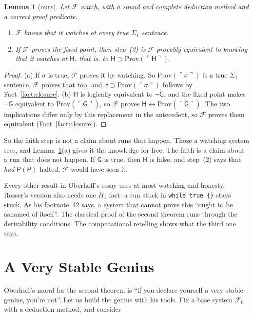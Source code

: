 \documentclass[11pt]{article}
\newcommand{\F}{\mathcal{F}}
\newcommand{\Fo}{\mathcal{F}_0}
\newcommand{\G}{\ddot{\mathsf{G}}}          %
\newcommand{\Hs}{\mathsf{H}}                %
\newcommand{\Prog}[1]{\mathsf{#1}}
\newcommand{\Prov}{\mathrm{Prov}}
\newcommand{\gn}[1]{\ulcorner #1\urcorner}  %
\theoremstyle{plain}
\newtheorem{lemma}[theorem]{Lemma}
\theoremstyle{definition}
\begin{document}
\begin{lemma}[ours]\label{lem:instances}
Let $\F$ watch, with a sound and complete deduction method and a correct
proof predicate.
\begin{enumerate}[label=(\alph*)]
\item $\F$ knows that it watches at every \emph{true} $\Sigma_1$ sentence.
\item If $\F$ proves the fixed point, then step~(2) is $\F$-provably
  equivalent to knowing that it watches at $\Hs$, that is, to
  $\Hs \supset \Prov(\gn{\Hs})$.
\end{enumerate}
\end{lemma}

\begin{proof}
(a) If $\sigma$ is true, $\F$ proves it by watching. So $\Prov(\gn{\sigma})$
is a true $\Sigma_1$ sentence, $\F$ proves that too, and
$\sigma \supset \Prov(\gn{\sigma})$ follows by Fact~\ref{fact:closure}.
(b) $\Hs$ is logically equivalent to $\neg\G$, and the fixed point makes
$\neg\G$ equivalent to $\Prov(\gn{\G})$, so $\F$ proves
$\Hs \leftrightarrow \Prov(\gn{\G})$. The two implications differ only by this
replacement in the antecedent, so $\F$ proves them equivalent
(Fact~\ref{fact:closure}).
\end{proof}

\noindent
So the faith step is not a claim about runs that happen. Those a watching
system sees, and Lemma~\ref{lem:instances}(a) gives it the knowledge for
free. The faith is a claim about a run that does not happen. If $\G$ is
true, then $\Hs$ is false, and step~(2) says that \emph{had}
$\Prog{P}(\Prog{P})$ halted, $\F$ would have seen it.

Every other result in Oberhoff's essay uses at most watching and honesty.
Rosser's version also needs one $\Pi_1$ fact: a run stuck in
\texttt{while true \{\}} stays stuck. As his footnote~12 says, a system that
cannot prove this ``ought to be ashamed of itself''. The classical proof of
the second theorem runs through the derivability conditions. The
computational retelling shows what the third one says.

\section{A Very Stable Genius}
\label{sec:genius}

Oberhoff's moral for the second theorem is ``if you declare yourself a very
stable genius, you're not''. Let us build the genius with his tools. Fix a
base system $\Fo$ with a deduction method, and consider
\end{document}
